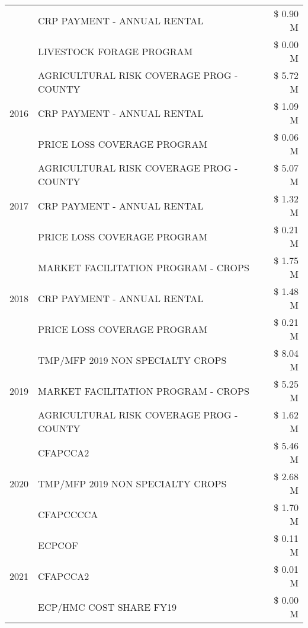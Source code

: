 \begin{tabular}{llr}
 & CRP PAYMENT - ANNUAL RENTAL & \$ 0.90 M \\
 & LIVESTOCK FORAGE PROGRAM & \$ 0.00 M \\
\cline{1-3}
\multirow[t]{3}{*}{2016} & AGRICULTURAL RISK COVERAGE PROG - COUNTY & \$ 5.72 M \\
 & CRP PAYMENT - ANNUAL RENTAL & \$ 1.09 M \\
 & PRICE LOSS COVERAGE PROGRAM & \$ 0.06 M \\
\cline{1-3}
\multirow[t]{3}{*}{2017} & AGRICULTURAL RISK COVERAGE PROG - COUNTY & \$ 5.07 M \\
 & CRP PAYMENT - ANNUAL RENTAL & \$ 1.32 M \\
 & PRICE LOSS COVERAGE PROGRAM & \$ 0.21 M \\
\cline{1-3}
\multirow[t]{3}{*}{2018} & MARKET FACILITATION PROGRAM - CROPS & \$ 1.75 M \\
 & CRP PAYMENT - ANNUAL RENTAL & \$ 1.48 M \\
 & PRICE LOSS COVERAGE PROGRAM & \$ 0.21 M \\
\cline{1-3}
\multirow[t]{3}{*}{2019} & TMP/MFP 2019 NON SPECIALTY CROPS & \$ 8.04 M \\
 & MARKET FACILITATION PROGRAM - CROPS & \$ 5.25 M \\
 & AGRICULTURAL RISK COVERAGE PROG - COUNTY & \$ 1.62 M \\
\cline{1-3}
\multirow[t]{3}{*}{2020} & CFAPCCA2 & \$ 5.46 M \\
 & TMP/MFP 2019 NON SPECIALTY CROPS & \$ 2.68 M \\
 & CFAPCCCCA & \$ 1.70 M \\
\cline{1-3}
\multirow[t]{3}{*}{2021} & ECPCOF & \$ 0.11 M \\
 & CFAPCCA2 & \$ 0.01 M \\
 & ECP/HMC COST SHARE FY19 & \$ 0.00 M \\
\cline{1-3}
\bottomrule
\end{tabular}
